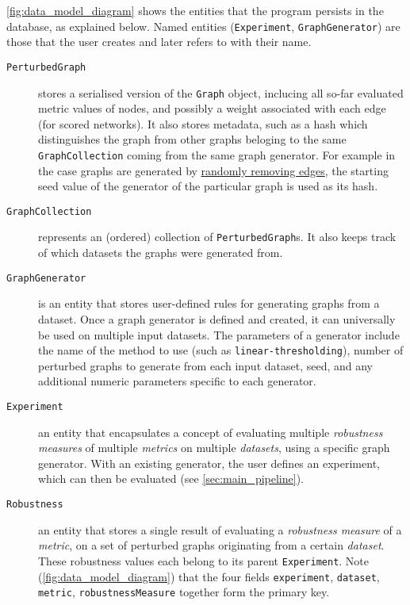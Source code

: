 \autoref{fig:data_model_diagram} shows the entities that the program persists in the database, as explained below.
Named entities (\texttt{Experiment}, \texttt{GraphGenerator}) are those that the user creates and later refers to with their name.
\begin{description}
    \item[\texttt{PerturbedGraph}]
    stores a serialised version of the \texttt{Graph} object, inclucing all so-far evaluated metric values of nodes, and possibly a weight associated with each edge (for scored networks).
    It also stores metadata, such as a hash which distinguishes the graph from other graphs beloging to the same \texttt{GraphCollection} coming from the same graph generator.
    For example in the case graphs are generated by \hyperref[sec:randomly_removing_edges]{randomly removing edges}, the starting seed value of the generator of the particular graph is used as its hash.

    \item[\texttt{GraphCollection}]
    represents an (ordered) collection of \texttt{PerturbedGraph}s.
    It also keeps track of which datasets the graphs were generated from.

    \item[\texttt{GraphGenerator}]
    is an entity that stores user-defined rules for generating graphs from a dataset.
    Once a graph generator is defined and created, it can universally be used on multiple input datasets.
    The parameters of a generator include the name of the method to use (such as \texttt{linear-thresholding}), number of perturbed graphs to generate from each input dataset, seed, and any additional numeric parameters specific to each generator.

    \item[\texttt{Experiment}]
    an entity that encapsulates a concept of evaluating multiple \textsl{robustness measures} of multiple \textsl{metrics} on multiple \textsl{datasets}, using a specific graph generator.
    With an existing generator, the user defines an experiment, which can then be evaluated (see \autoref{sec:main_pipeline}).

    \item[\texttt{Robustness}]
    an entity that stores a single result of evaluating a \textsl{robustness measure} of a \textsl{metric}, on a set of perturbed graphs originating from a certain \textsl{dataset}.
    These robustness values each belong to its parent \texttt{Experiment}.
    Note (\autoref{fig:data_model_diagram}) that the four fields \texttt{experiment}, \texttt{dataset}, \texttt{metric}, \texttt{robustnessMeasure} together form the primary key.
\end{description}

